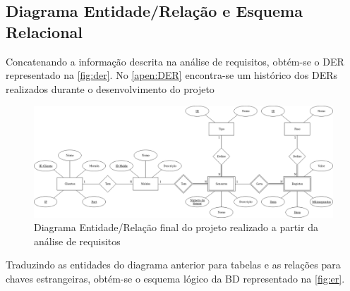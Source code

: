 \documentclass[11pt,twoside,a4paper]{report}
\begin{document}
\subsection{Diagrama Entidade/Relação e Esquema Relacional}
Concatenando a informação descrita na análise de requisitos, obtém-se o DER representado na \autoref{fig:der}. No \autoref{apen:DER} encontra-se um histórico dos DERs realizados durante o desenvolvimento do projeto\par
\newpage
\begin{landscape}
	\begin{figure}
		\begin{center}
			\includegraphics[width=1.4\textwidth]{diagrama_entidade_relacao} %
			\caption[Diagrama Entidade/Relação final do projeto]{Diagrama Entidade/Relação final do projeto realizado a partir da análise de requisitos}
			\label{fig:der}
		\end{center}
	\end{figure}
\end{landscape}
Traduzindo as entidades do diagrama anterior para tabelas e as relações para chaves estrangeiras, obtém-se o esquema lógico da BD representado na \autoref{fig:er}.
\end{document}
